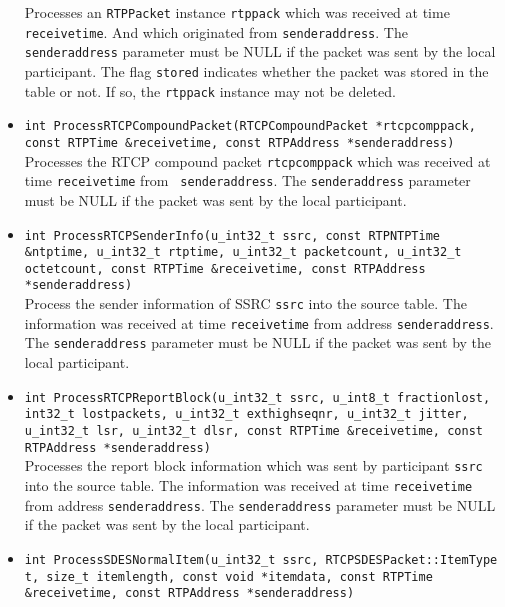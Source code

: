 \documentclass[12pt,a4paper]{article}
\begin{document}
\begin{itemize}
						Processes an {\tt RTPPacket} instance {\tt rtppack} which was 
						received at time {\tt receivetime}. And which originated from
						{\tt senderaddress}. The {\tt senderaddress} parameter must
						be NULL if the packet was sent by the local participant. The
						flag {\tt stored} indicates whether the packet was stored in
						the table or not. If so, the {\tt rtppack} instance may not
						be deleted.
					\item {\tt int ProcessRTCPCompoundPacket(RTCPCompoundPacket *rtcpcomppack, const RTPTime \&receivetime,
					                                         const RTPAddress *senderaddress)}\\
						Processes the RTCP compound packet {\tt rtcpcomppack}
						which was received at time {\tt receivetime} from {\tt
						senderaddress}. The {\tt senderaddress} parameter must
						be NULL if the packet was sent by the local participant.
					\item {\tt int ProcessRTCPSenderInfo(u\_int32\_t ssrc, const RTPNTPTime \&ntptime, u\_int32\_t rtptime,
					                                     u\_int32\_t packetcount, u\_int32\_t octetcount, const RTPTime \&receivetime,
					                                     const RTPAddress *senderaddress)}\\
						Process the sender information of SSRC {\tt ssrc} into
						the source table. The information was received at time
						{\tt receivetime} from address {\tt senderaddress}. The
						{\tt senderaddress} parameter must be NULL if the packet
						was sent by the local participant.
					\item {\tt int ProcessRTCPReportBlock(u\_int32\_t ssrc, u\_int8\_t fractionlost, int32\_t lostpackets,
					                                      u\_int32\_t exthighseqnr, u\_int32\_t jitter, u\_int32\_t lsr,
					                                      u\_int32\_t dlsr, const RTPTime \&receivetime, const RTPAddress *senderaddress)}\\
						Processes the report block information which was sent
						by participant {\tt ssrc} into the source table. The
						information was received at time {\tt receivetime} from
						address {\tt senderaddress}. The {\tt senderaddress}
						parameter must be NULL if the packet was sent by the
						local participant.
					\item {\tt int ProcessSDESNormalItem(u\_int32\_t ssrc, RTCPSDESPacket::ItemType t, size\_t itemlength,
					                                     const void *itemdata, const RTPTime \&receivetime, const RTPAddress *senderaddress)}\\

\end{itemize}
\end{document}

